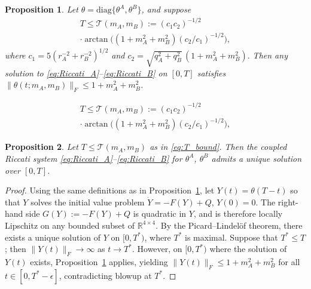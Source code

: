 \documentclass[10pt,a4paper]{amsart}
\newtheorem{proposition}{Proposition}
\newcommand{\R}{\mathbb R}
\newcommand{\diag}{\mathrm{diag}}
\newcommand{\rh}[1]{\textcolor{purple}{\textsf{[RH: #1]}}}
\begin{document}
\begin{proposition}\label{prop:theta_bound}
    Let $\theta = \diag\{\theta^A, \theta^B\}$, and suppose \vspace{-0.3em}    
    \begin{multline}\label{eq:T_bound}
        T \leq \mathcal{T}(m_A, m_B)
        := (c_1 c_2)^{-1/2}  \\ \cdot\arctan \big((1+m_A^2 + m_B^2)(c_2/c_1)^{-1/2}\big),
    \end{multline}
    where $c_1 = 5 (r_A^{-2} + r_B^{-2})^{1/2}$ and $c_2= \sqrt{q_A^2 + q_B^2}\,(1 + m_A^2 + m_B^2).$ 
    Then any solution to \eqref{eq:Riccati_A}--\eqref{eq:Riccati_B} on $[0,T]$ satisfies $\big\|\theta(t; m_A, m_B)\big\|_F \le 1 + m_A^2 + m_B^2$. 
\end{proposition}

    \begin{multline}
        T \leq \mathcal{T}(m_A, m_B)
        := (c_1 c_2)^{-1/2}  \\ \cdot\arctan \big((1+m_A^2 + m_B^2)(c_2/c_1)^{-1/2}\big),
    \end{multline}

\begin{proposition}\label{prop:exist_unique_baseline}
    Let $T \leq \mathcal{T}(m_A, m_B)$ as in \eqref{eq:T_bound}.  Then the coupled Riccati system \eqref{eq:Riccati_A}--\eqref{eq:Riccati_B} for $\theta^A$, $\theta^B$ %
    admits a unique solution over $[0,T]$.
\end{proposition}

\begin{proof}
    Using the same definitions as in Proposition~\ref{prop:theta_bound}, let $Y(t) = \theta(T-t)$ so that $Y$ solves the initial value problem $\dot{Y} = -F(Y) + Q$, $Y(0) = 0$.  
    The right-hand side $G(Y) := -F(Y) + Q$ is quadratic in $Y$, and is therefore locally Lipschitz on any bounded subset of $\R^{4\times 4}$.
    By the Picard--Lindel\"of theorem, there exists a unique solution of $Y$ on $[0,T^\ast)$, where $T^\ast$ is maximal.
    Suppose that $T^* \leq T$; then $\|Y(t)\|_F \to \infty$ as $t \to T^*$. 
    However, on $[0, T^\ast)$ where the solution of $Y(t)$ exists, Proposition~\ref{prop:theta_bound} applies, yielding $\|Y(t)\|_F \leq 1 + m_A^2 + m_B^2$ for all $t \in [0,T^\ast - \epsilon]$, contradicting blowup at $T^*$. %
\end{proof}
\end{document}
